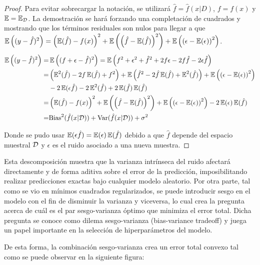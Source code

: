 \begin{proof}

Para evitar sobrecargar la notación, se utilizará $\hat{f}=\hat{f}(x|D)$, $f=f(x)$ y $\operatorname{\mathbb{E}}=\operatorname{\mathbb{E}}_{\mathcal D}$. La demostración se hará forzando una completación de cuadrados y mostrando que los términos residuales son nulos para llegar a que $\operatorname{\mathbb{E}}\left((y-\hat{f})^2\right) = \left(\operatorname{\mathbb{E}}(\hat{f}) - f(x)\right)^2 + \operatorname{\mathbb{E}}\left(\left(\hat{f}-\operatorname{\mathbb{E}}(\hat{f})\right)^2\right) + \operatorname{\mathbb{E}}\left(\left(\epsilon-\operatorname{\mathbb{E}}(\epsilon)\right)^2\right)$.
\begin{align*}
	\operatorname{\mathbb{E}}\left((y-\hat{f})^2\right) =& \operatorname{\mathbb{E}}\left((f+\epsilon-\hat{f})^2\right) = \operatorname{\mathbb{E}}\left(f^2+\epsilon^2+\hat{f}^2 +2f\epsilon - 2f\hat{f} - 2\epsilon \hat{f}\right)\\
	=&\left(\operatorname{\mathbb{E}}^2(\hat{f})-2f\operatorname{\mathbb{E}}(\hat{f}) + f^2\right) + \operatorname{\mathbb{E}}\left(\hat{f}^2-2\hat{f}\operatorname{\mathbb{E}}(\hat{f})+\operatorname{\mathbb{E}}^2(\hat{f})\right) + \operatorname{\mathbb{E}}\left(\left(\epsilon-\operatorname{\mathbb{E}}(\epsilon)\right)^2\right)\\
	& - 2\operatorname{\mathbb{E}}(\epsilon\hat{f})-2\operatorname{\mathbb{E}}^2(\hat{f})+2\operatorname{\mathbb{E}}(\hat{f})\operatorname{\mathbb{E}}(\hat{f})\\
	=& \left(\operatorname{\mathbb{E}}(\hat{f}) - f(x)\right)^2 + \operatorname{\mathbb{E}}\left(\left(\hat{f}-\operatorname{\mathbb{E}}(\hat{f})\right)^2\right) + \operatorname{\mathbb{E}}\left(\left(\epsilon-\operatorname{\mathbb{E}}(\epsilon)\right)^2\right) - 2\operatorname{\mathbb{E}}(\epsilon)\operatorname{\mathbb{E}}(\hat{f})\\
	= & \text{Bias}^2(\hat{f}(x|{\mathcal D})) + \text{Var}(\hat{f}(x|{\mathcal D})) + \sigma^2
\end{align*}

Donde se pudo usar $\operatorname{\mathbb{E}}(\epsilon\hat{f})=\operatorname{\mathbb{E}}(\epsilon)\operatorname{\mathbb{E}}(\hat{f})$ debido a que $\hat{f}$ depende del espacio muestral ${\mathcal D}$ y $\epsilon$ es el ruido asociado a una nueva muestra.

\end{proof} 

Esta descomposición muestra que la varianza intrínseca del ruido afectará directamente y de forma aditiva sobre el error de la predicción, imposibilitando realizar predicciones exactas bajo cualquier modelo aleatorio. Por otra parte, tal como se vio en mínimos cuadrados regularizados, se puede introducir sesgo en el modelo con el fin de disminuir la varianza y viceversa, lo cual crea la pregunta acerca de cuál es el par sesgo-varianza óptimo que minimiza el error total. Dicha pregunta se conoce como dilema sesgo-varianza (bias-variance tradeoff) y juega un papel importante en la selección de hiperparámetros del modelo.

\newpage

De esta forma, la combinación sesgo-varianza crea un error total convexo tal como se puede observar en la siguiente figura:


